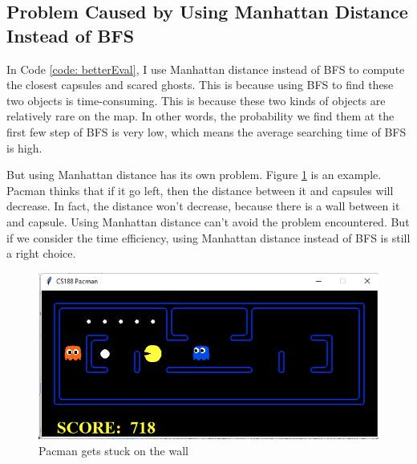 \documentclass{article}[12pt]
\begin{document}
\subsection{Problem Caused by Using Manhattan Distance Instead of BFS}
In Code \ref{code: betterEval}, I use Manhattan distance instead of BFS to compute the closest capsules and scared ghosts. This is because using BFS to find these two objects is time-consuming. This is because these two kinds of objects are relatively rare on the map. In other words, the probability we find them at the first few step of BFS is very low, which means the average searching time of BFS is high. 

But using Manhattan distance has its own problem. Figure \ref{fig:screenshot005} is an example. Pacman thinks that if it go left, then the distance between it and capsules will decrease. In fact, the distance won't decrease, because there is a wall between it and capsule. Using Manhattan distance can't avoid the problem encountered. But if we consider the time efficiency, using Manhattan distance instead of BFS is still a right choice. 

\begin{figure}[H]
\centering
\includegraphics[width=0.5\linewidth]{screenshot005}
\caption{Pacman gets stuck on the wall}
\label{fig:screenshot005}
\end{figure}
\end{document}
